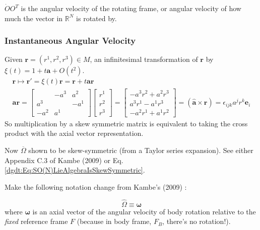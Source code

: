 $\dot{O} O^T$ is the angular velocity of the rotating frame, or angular velocity of how much the vector in $\mathbb{R}^N$ is rotated by.

\subsubsection{Instantaneous Angular Velocity}

Given $\mathbf{r} = (r^1, r^2 , r^3) \in M$, an infinitesimal transformation of $\mathbf{r}$ by $\xi(t) = 1 + t\mathbf{a} + O(t^2)$. 
\[
\begin{gathered}
\mathbf{r} \mapsto \mathbf{r}' = \xi(t) \mathbf{r} = \mathbf{r} + t\mathbf{a} \mathbf{r} \\
\mathbf{a} \mathbf{r} = \left[ \begin{matrix} & -a^3 & a^2 \\ a^3 & & -a^1 \\ -a^2 & a^1 & \end{matrix} \right] \left[ \begin{matrix} r^1 \\ r^2 \\ r^3 \end{matrix} \right] = \left[ \begin{matrix} -a^3 r^2 + a^2 r^3 \\ a^3 r^1 - a^1 r^3 \\ -a^2 r^1 + a^1 r^2 \end{matrix} \right] = (\widehat{\mathbf{a}} \times \mathbf{r} ) = \epsilon_{ijk} a^j r^k \mathbf{e}_i
\end{gathered}
\]
So multiplication by a skew symmetric matrix is equivalent to taking the cross product with the axial vector representation.

Now $\overline{\Omega}$ shown to be skew-symmetric (from a Taylor series expansion). See either Appendix C.3 of  Kambe (2009) \cite{dgdt:TKambe2009} or Eq. \ref{dgdt:Eq:SO(N)LieAlgebraIsSkewSymmetric}.

Make the following notation change from Kambe's (2009) \cite{dgdt:TKambe2009}:

\begin{equation}
\widehat{\Omega} \equiv \mathbf{\omega}
\end{equation}
where $\mathbf{\omega}$ is an axial vector of the angular velocity of body rotation relative to the \emph{fixed} reference frame $F$ (because in body frame, $F_B$, there's no rotation!).


